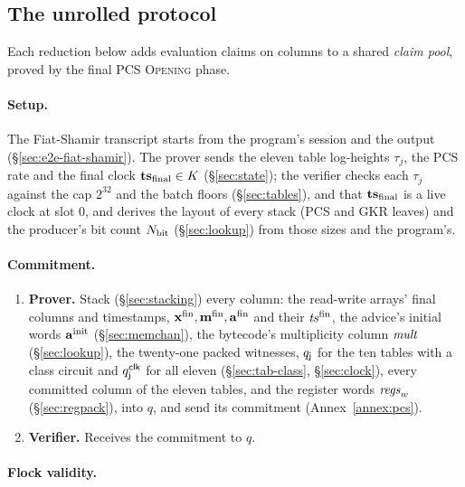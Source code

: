 \subsection{The unrolled protocol}\label{sec:e2e-unrolled}

Each reduction below adds evaluation claims on columns to a shared \emph{claim pool}, proved by the final PCS \textsc{Opening} phase.

\paragraph{Setup.}

The Fiat-Shamir transcript starts from the program's session and the output (\S\ref{sec:e2e-fiat-shamir}). The prover sends the eleven table log-heights $\tau_j$, the PCS rate and the final clock $\mathbf{ts}_{\mathrm{final}}\in K$ (\S\ref{sec:state}); the verifier checks each $\tau_j$ against the cap $2^{32}$ and the batch floors (\S\ref{sec:tables}), and that $\mathbf{ts}_{\mathrm{final}}$ is a live clock at slot $0$, and derives the layout of every stack (PCS and GKR leaves) and the producer's bit count $N_{\mathrm{bit}}$ (\S\ref{sec:lookup}) from those sizes and the program's.

\paragraph{Commitment.}

\begin{enumerate}
\item \textbf{Prover.} Stack (\S\ref{sec:stacking}) every column: the read-write arrays' final columns and timestamps, $\mathbf{x}^{\mathrm{fin}},\mathbf{m}^{\mathrm{fin}},\mathbf{a}^{\mathrm{fin}}$ and their $\mathit{ts}^{\mathrm{fin}}$, the advice's initial words $\mathbf{a}^{\mathrm{init}}$ (\S\ref{sec:memchan}), the bytecode's multiplicity column $\mathit{mult}$ (\S\ref{sec:lookup}), the twenty-one packed witnesses, $q_{\mathsf{j}}$ for the ten tables with a class circuit and $q^{\mathsf{clk}}_{\mathsf{j}}$ for all eleven (\S\ref{sec:tab-class}, \S\ref{sec:clock}), every committed column of the eleven tables, and the register words $\mathit{regs}_{w}$ (\S\ref{sec:regpack}), into $q$, and send its commitment (Annex~\ref{annex:pcs}).
\item \textbf{Verifier.} Receives the commitment to $q$.
\end{enumerate}

\paragraph{Flock validity.}

